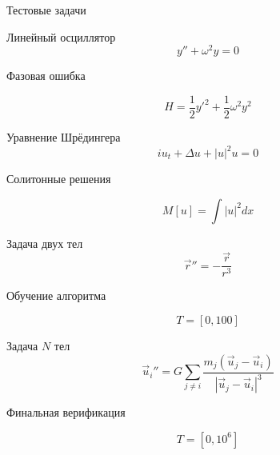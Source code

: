 \begin{frame}{Тестовые задачи}
	\small
	
	\begin{minipage}[t][0.32\textheight][t]{0.48\textwidth}
		\begin{block}{Линейный осциллятор}
			\[
			y''+\omega^2y=0
			\]
			
			Фазовая ошибка
			
			\[
			H=\frac12 y'^2+\frac12\omega^2y^2
			\]
			
		\end{block}
	\end{minipage}
	\hfill
	\begin{minipage}[t][0.32\textheight][t]{0.48\textwidth}
		\begin{block}{Уравнение Шрёдингера}
			\[
			iu_t+\Delta u+|u|^2u=0
			\]
			
			Солитонные решения
			
			\[
			M[u]=\int |u|^2dx
			\]
			
		\end{block}
	\end{minipage}
	
	\vspace{0.2cm}
	
	\begin{minipage}[t][0.32\textheight][t]{0.48\textwidth}
		\begin{block}{Задача двух тел}
			\[
			\vec r''=-\frac{\vec r}{r^3}
			\]
			
			Обучение алгоритма
			
			\[
			T=[0,100]
			\]
			
		\end{block}
	\end{minipage}
	\hfill
	\begin{minipage}[t][0.32\textheight][t]{0.48\textwidth}
	\begin{block}{Задача \(N\) тел}
			\[
			\vec u_i''=
			G\sum_{j\neq i}
			\frac{m_j(\vec u_j-\vec u_i)}
			{|\vec u_j-\vec u_i|^3}
			\]
			
			Финальная верификация
			
			\[
			T=[0,10^6]
			\]
			
	\end{block}
	\end{minipage}
	
\end{frame}